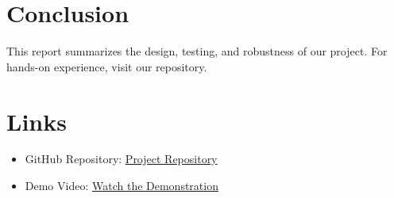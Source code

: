 \documentclass[a4paper,12pt]{article}
\begin{document}
\section{Conclusion}
This report summarizes the design, testing, and robustness of our project. For hands-on experience, visit our repository.

\section{Links}
\begin{itemize}
    \item GitHub Repository: \href{https://github.com/KeshavBansal0122/COP290}{Project Repository}
    \item Demo Video: \href{https://csciitd-my.sharepoint.com/:v:/g/personal/cs1230493_iitd_ac_in/EXs9cKn7_x9FpL2C1RVsCVgBn0sYHBeg11Ds_wZ74Mn--A?e=n3FFeg}{Watch the Demonstration}
\end{itemize}
\end{document}
